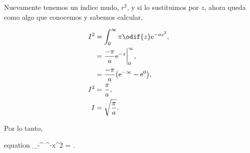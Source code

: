 \documentclass[../main.tex]{subfiles}
\begin{document}
\begin{problema}[10]
	Nuevamente tenemos un índice mudo, \(r^{2}\), y si lo sustituimos por
	\(z\), ahora queda como algo que conocemos y sabemos calcular,

	\begin{align*}
		I^{2} & = \int_{0}^{\infty} \pi \odif{z} \mathrm{e}^{-a z^{2}},              \\
		      & = \dfrac{-\pi}{a} \biggl.\mathrm{e}^{-z}\biggr\rvert_{0}^{\infty},   \\
		      & = \dfrac{-\pi}{a} \bigl(\mathrm{e}^{-\infty} - \mathrm{e}^{0}\bigr), \\
		I^{2} & = \dfrac{\pi}{a},                                                    \\
		I     & = \sqrt{\dfrac{\pi}{a}}.
	\end{align*}

	Por lo tanto,

	\begin{empheq}[box=\mainresult]{equation}
		\int_{-\infty}^{\infty} ^{-x^{2}} = .
		\label{eq:intNormalDist}
	\end{empheq}
\end{problema}
\end{document}
